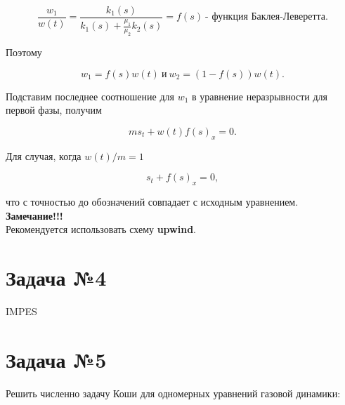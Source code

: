 \documentclass[12pt,a4paper]{article}
\begin{document}
        \[
                \frac{w_{1}}{w(t)} = \frac{k_{1}(s)}{k_{1}(s) + \frac{\mu_{1}}{\mu_{2}} k_{2}(s)} = f(s) \: \mbox{- функция Баклея-Леверетта}.
        \]

        Поэтому

        \[
                w_{1} = f(s) w(t) \: \mbox{и} \: w_{2} = (1 - f(s)) w(t).
        \]

        Подставим последнее соотношение для $w_{1}$ в уравнение неразрывности для первой фазы, получим

        \[
                m s_{t} + w(t) f(s)_{x} = 0.
        \]

        Для случая, когда $w(t)/m = 1$

        \[
                s_{t} + f(s)_{x} = 0,
        \]

		что с точностью до обозначений совпадает с исходным уравнением.\\

        \textbf{\large Замечание!!!}\\

        Рекомендуется использовать схему \textbf{upwind}.

		\newpage

	\section*{Задача №4}

        IMPES
		\newpage

	\section*{Задача №5}

		Решить численно задачу Коши для одномерных уравнений газовой динамики:
\end{document}
